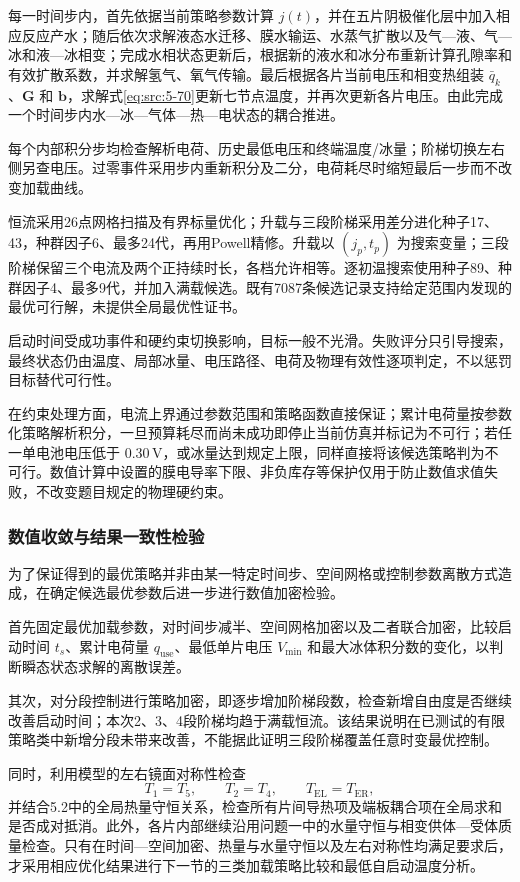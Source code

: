 \documentclass[bwprint]{gmcmthesis}
\numberwithin{equation}{section}
\numberwithin{figure}{section}
\begin{document}
 每一时间步内，首先依据当前策略参数计算 \(j(t)\)，并在五片阴极催化层中加入相应反应产水；随后依次求解液态水迁移、膜水输运、水蒸气扩散以及气—液、气—冰和液—冰相变；完成水相状态更新后，根据新的液水和冰分布重新计算孔隙率和有效扩散系数，并求解氢气、氧气传输。最后根据各片当前电压和相变热组装 \(\bar{q}_k\)、\(\mathbf{G}\) 和 \(\mathbf{b}\)，求解式\eqref{eq:src:5-70}更新七节点温度，并再次更新各片电压。由此完成一个时间步内水—冰—气体—热—电状态的耦合推进。

每个内部积分步均检查解析电荷、历史最低电压和终端温度/冰量；阶梯切换左右侧另查电压。过零事件采用步内重新积分及二分，电荷耗尽时缩短最后一步而不改变加载曲线。


恒流采用26点网格扫描及有界标量优化；升载与三段阶梯采用差分进化种子17、43，种群因子6、最多24代，再用Powell精修。升载以 $(j_p,t_p)$ 为搜索变量；三段阶梯保留三个电流及两个正持续时长，各档允许相等。逐初温搜索使用种子89、种群因子4、最多9代，并加入满载候选。既有7087条候选记录支持给定范围内发现的最优可行解，未提供全局最优性证书。

启动时间受成功事件和硬约束切换影响，目标一般不光滑。失败评分只引导搜索，最终状态仍由温度、局部冰量、电压路径、电荷及物理有效性逐项判定，不以惩罚目标替代可行性。

 在约束处理方面，电流上界通过参数范围和策略函数直接保证；累计电荷量按参数化策略解析积分，一旦预算耗尽而尚未成功即停止当前仿真并标记为不可行；若任一单电池电压低于 \(0.30 \, \text{V}\)，或冰量达到规定上限，同样直接将该候选策略判为不可行。数值计算中设置的膜电导率下限、非负库存等保护仅用于防止数值求值失败，不改变题目规定的物理硬约束。

\subsubsection{数值收敛与结果一致性检验}

 为了保证得到的最优策略并非由某一特定时间步、空间网格或控制参数离散方式造成，在确定候选最优参数后进一步进行数值加密检验。

 首先固定最优加载参数，对时间步减半、空间网格加密以及二者联合加密，比较启动时间 \(t_s\)、累计电荷量 \(q_{\text{use}}\)、最低单片电压 \(V_{\text{min}}\) 和最大冰体积分数的变化，以判断瞬态状态求解的离散误差。

 其次，对分段控制进行策略加密，即逐步增加阶梯段数，检查新增自由度是否继续改善启动时间；本次2、3、4段阶梯均趋于满载恒流。该结果说明在已测试的有限策略类中新增分段未带来改善，不能据此证明三段阶梯覆盖任意时变最优控制。

 同时，利用模型的左右镜面对称性检查
\[
T_1 = T_5, \qquad T_2 = T_4, \qquad T_{\text{EL}} = T_{\text{ER}},
\]
并结合5.2中的全局热量守恒关系，检查所有片间导热项及端板耦合项在全局求和是否成对抵消。此外，各片内部继续沿用问题一中的水量守恒与相变供体—受体质量检查。只有在时间—空间加密、热量与水量守恒以及左右对称性均满足要求后，才采用相应优化结果进行下一节的三类加载策略比较和最低自启动温度分析。
\end{document}

